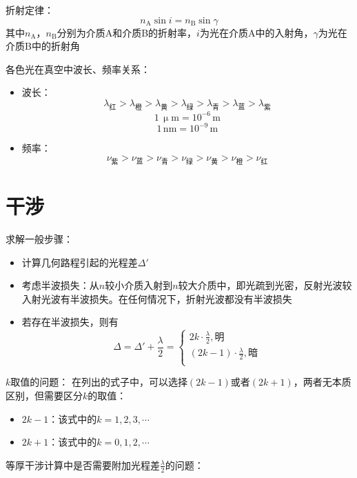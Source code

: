 \documentclass[12pt, a4paper, twoside]{ctexbook}
\begin{document}
{\sonti 折射定律}：
$$
n_\mathrm{A}\sin i=n_\mathrm{B}\sin \gamma
$$
其中$n_\mathrm{A}$，$n_\mathrm{B}$分别为介质A和介质B的折射率，$i$为光在介质A中的入射角，$\gamma$为光在介质B中的折射角

{\sonti 各色光在真空中波长、频率关系}：
\begin{itemize}
    \item 波长：
    $$
    \lambda_\text{红}>\lambda_\text{橙}>\lambda_\text{黄}>\lambda_\text{绿}>\lambda_\text{青}>\lambda_\text{蓝}>\lambda_\text{紫}
    $$
    $$
    1\,\upmu\mathrm{m}=10^{-6}\,\mathrm{m}
    $$
    $$
    1\,\mathrm{nm}=10^{-9}\,\mathrm{m}
    $$
    \item 频率：
    $$
    \nu_\text{紫}>\nu_\text{蓝}>\nu_\text{青}>\nu_\text{绿}>\nu_\text{黄}>\nu_\text{橙}>\nu_\text{红}
    $$
\end{itemize}
\section{干涉}
{\sonti 求解一般步骤}：
\begin{itemize}
    \item 计算几何路程引起的光程差$\Delta'$
    \item 考虑半波损失：从$n$较小介质入射到$n$较大介质中，即光疏到光密，反射光波较入射光波有半波损失。在任何情况下，折射光波都没有半波损失
    \item 若存在半波损失，则有
    $$
    \Delta=\Delta'+\frac{\lambda}{2}=
    \left\{ \begin{array}{l}
        2k\cdot \frac{\lambda}{2},\text{明}\\
        \left( 2k-1 \right) \cdot \frac{\lambda}{2},\text{暗}\\
    \end{array} \right. 
    $$
\end{itemize}

{\sonti $k$取值的问题}：
在列出的式子中，可以选择$\left(2k-1\right)$或者$\left(2k+1\right)$，两者无本质区别，但需要区分$k$的取值：
\begin{itemize}
    \item $2k-1$：该式中的$k=1,2,3,\cdots$
    \item $2k+1$：该式中的$k=0,1,2,\cdots$
\end{itemize}

{\sonti 等厚干涉计算中是否需要附加光程差}$\frac{\lambda}{2}${\sonti 的问题}：
\end{document}
